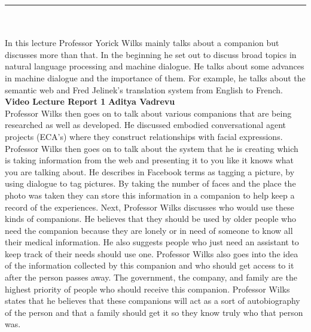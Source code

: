 \documentclass[a4paper, 11pt]{article}
\begin{document}
\noindent\rule{16cm}{0.4pt}\\
\\
In this lecture Professor Yorick Wilks mainly talks about a companion but discusses more than that. In the beginning he set out to discuss broad topics in natural language processing and machine dialogue. He talks about some advances in machine dialogue and the importance of them. For example, he talks about the semantic web and Fred Jelinek’s translation system from English to French.
\\ 
\large\textbf{Video Lecture Report 1} \hfill \textbf{Aditya Vadrevu} \\
Professor Wilks then goes on to talk about various companions that are being researched as well as developed. He discussed embodied conversational agent projects (ECA’s) where they construct relationships with facial expressions. Professor Wilks then goes on to talk about the system that he is creating which is taking information from the web and presenting it to you like it knows what you are talking about. He describes in Facebook terms as tagging a picture, by using dialogue to tag pictures. By taking the number of faces and the place the photo was taken they can store this information in a companion to help keep a record of the experiences. Next, Professor Wilks discusses who would use these kinds of companions. He believes that they should be used by older people who need the companion because they are lonely or in need of someone to know all their medical information. He also suggests people who just need an assistant to keep track of their needs should use one. Professor Wilks also goes into the idea of the information collected by this companion and who should get access to it after the person passes away. The government, the company, and family are the highest priority of people who should receive this companion. Professor Wilks states that he believes that these companions will act as a sort of autobiography of the person and that a family should get it so they know truly who that person was.
\end{document}
